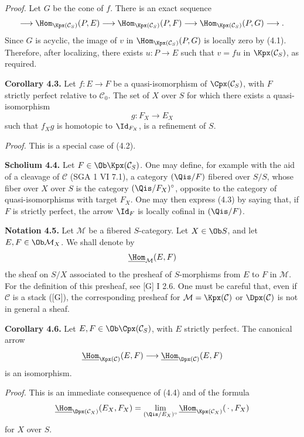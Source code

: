 \documentclass[11pt]{article}
\begin{document}
\emph{Proof.} Let \(G\) be the cone of \(f\). There is an exact sequence
\[
  \longrightarrow \Hom_{\Kpx(\mathcal C_S)}(P,E)
  \longrightarrow \Hom_{\Kpx(\mathcal C_S)}(P,F)
  \longrightarrow \Hom_{\Kpx(\mathcal C_S)}(P,G)
  \longrightarrow .
\]
Since \(G\) is acyclic, the image of \(v\) in \(\Hom_{\Kpx(\mathcal C_S)}(P,G)\) is locally zero by (4.1). Therefore, after localizing, there exists \(u:P\to E\) such that \(v=fu\) in \(\Kpx(\mathcal C_S)\), as required.

\textbf{Corollary 4.3.} Let \(f:E\to F\) be a quasi-isomorphism of \(\Cpx(\mathcal C_S)\), with \(F\) strictly perfect relative to \(\mathcal C_0\). The set of \(X\) over \(S\) for which there exists a quasi-isomorphism
\[
  g:F_X\longrightarrow E_X
\]
such that \(f_Xg\) is homotopic to \(\Id_{F_X}\), is a refinement of \(S\).

\emph{Proof.} This is a special case of (4.2).

\textbf{Scholium 4.4.} Let \(F\in\Ob\Kpx(\mathcal C_S)\). One may define, for example with the aid of a cleavage of \(\mathcal C\) (SGA 1 VI 7.1), a category \((\Qis/F)\) fibered over \(S/S\), whose fiber over \(X\) over \(S\) is the category \((\Qis/F_X)^\circ\), opposite to the category of quasi-isomorphisms with target \(F_X\). One may then express (4.3) by saying that, if \(F\) is strictly perfect, the arrow \(\Id_F\) is locally cofinal in \((\Qis/F)\).

\textbf{Notation 4.5.} Let \(\mathcal M\) be a fibered \(S\)-category. Let \(X\in\Ob S\), and let \(E,F\in\Ob\mathcal M_X\). We shall denote by
\[
  \underline{\Hom}_{\mathcal M}(E,F)
\]
the sheaf on \(S/X\) associated to the presheaf of \(S\)-morphisms from \(E\) to \(F\) in \(\mathcal M\). For the definition of this presheaf, see [G] I 2.6. One must be careful that, even if \(\mathcal C\) is a stack ([G]), the corresponding presheaf for \(\mathcal M=\Kpx(\mathcal C)\) or \(\Dpx(\mathcal C)\) is not in general a sheaf.

\textbf{Corollary 4.6.} Let \(E,F\in\Ob\Cpx(\mathcal C_S)\), with \(E\) strictly perfect. The canonical arrow
\[
  \underline{\Hom}_{\Kpx(\mathcal C)}(E,F)
  \longrightarrow
  \underline{\Hom}_{\Dpx(\mathcal C)}(E,F)
\]
is an isomorphism.

\emph{Proof.} This is an immediate consequence of (4.4) and of the formula
\[
  \underline{\Hom}_{\Dpx(\mathcal C_X)}(E_X,F_X)
  = \lim_{(\Qis/E_X)^\circ}\underline{\Hom}_{\Kpx(\mathcal C_X)}(\,\cdot\,,F_X)
\]
for \(X\) over \(S\).
\end{document}
